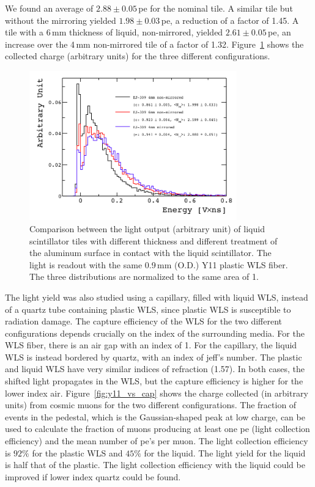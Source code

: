 \documentclass[review]{elsarticle}
\begin{document}
We found an average of 
$2.88\pm 0.05$\,pe for the nominal tile. A similar tile but without
the mirroring yielded $1.98\pm 0.03$\,pe, a reduction of a factor of
1.45. A tile with a 6\,mm thickness of liquid, non-mirrored, yielded
$2.61\pm 0.05$\,pe, an increase over the 4\,mm non-mirrored tile of a
factor of 1.32.
Figure~\ref{fig:thickness_comp} shows the collected charge (arbitrary units)
for the three different configurations.

\begin{figure}[!ht]
\begin{center}
\includegraphics[width=0.8\textwidth]{./figures/list_NEW_PROTOTYPES_all.png}
\caption{Comparison between the light output (arbitrary unit)
  of liquid scintillator
  tiles with different thickness and different treatment of the
  aluminum surface in contact with the liquid scintillator. The light
  is readout with the same 0.9\,mm (O.D.) Y11 plastic WLS fiber. The
  three distributions are normalized to the same area of 1.}
\label{fig:thickness_comp}
\end{center}
\end{figure}


The light yield was also studied using a capillary, filled
with liquid WLS, instead of a quartz tube containing plastic WLS, since
plastic WLS is susceptible to radiation damage.
The capture efficiency of the WLS for the two different configurations
depends crucially on the index of the surrounding media.  For the WLS fiber,
there is an air gap with an index of 1.  For the capillary, the liquid WLS
is instead bordered by quartz, with an index of {\color{red} jeff's number}.
The plastic and liquid WLS have very similar
indices of refraction (1.57).  In both cases, the shifted light propagates
in the WLS, but the capture efficiency is higher for the lower index air.
Figure~\ref{fig:y11_vs_cap} shows the charge collected (in arbitrary units)
from cosmic muons for the two different configurations.  The fraction of
events in the pedestal, which is the Gaussian-shaped peak at low charge,
can be used to calculate the fraction of muons producing at least one pe
(light collection efficiency)
and the mean number of pe's per muon.
The light collection efficiency
is  $92\%$ for the plastic WLS and  $45\%$ for the liquid.  The light
yield for the liquid is half that of the plastic.
The light collection efficiency with the liquid could be improved
if lower index quartz
could be found.
\end{document}
